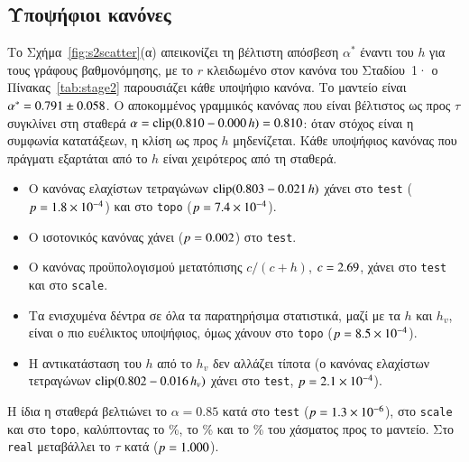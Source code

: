 \documentclass[11pt,a4paper]{article}
\theoremstyle{definition}
\theoremstyle{remark}
\newcommand{\clip}{\mathrm{clip}}
\begin{document}
\subsection{Υποψήφιοι κανόνες}
Το Σχήμα~\ref{fig:s2scatter}(α) απεικονίζει τη βέλτιστη απόσβεση $\alpha^*$ έναντι του $h$ για τους
γράφους βαθμονόμησης, με το $r$ κλειδωμένο στον κανόνα του Σταδίου~1· ο Πίνακας~\ref{tab:stage2}
παρουσιάζει κάθε υποψήφιο κανόνα. Το μαντείο είναι $\alpha^*=0.791\pm0.058$. Ο
αποκομμένος γραμμικός κανόνας που είναι βέλτιστος ως προς $\tau$ συγκλίνει στη σταθερά
$\alpha=\clip(0.810-0.000\,h)=\STwoConstAlpha$: όταν στόχος είναι η συμφωνία κατατάξεων, η κλίση ως προς
$h$ μηδενίζεται. Κάθε υποψήφιος κανόνας που πράγματι εξαρτάται από το $h$ είναι χειρότερος από τη
σταθερά.
\begin{itemize}[leftmargin=1.4em,itemsep=0pt]
\item Ο κανόνας ελαχίστων τετραγώνων $\clip(\STwoLSa\STwoLSb\,h)$ χάνει \STwoTestLSvsConst{} στο
\texttt{test} ($p=1.8\times10^{-4}$) και \STwoTopoLSvsConst{} στο \texttt{topo}
($p=7.4\times10^{-4}$).
\item Ο ισοτονικός κανόνας χάνει \STwoTestIsoVsConst{} ($p=0.002$) στο \texttt{test}.
\item Ο κανόνας προϋπολογισμού μετατόπισης $c/(c+h)$, $c=2.69$, χάνει \STwoTestBudVsConst{} στο
\texttt{test} και \STwoScaleBudVsConst{} στο \texttt{scale}.
\item Τα ενισχυμένα δέντρα σε όλα τα παρατηρήσιμα στατιστικά, μαζί με τα $h$ και $h_v$, είναι ο πιο
ευέλικτος υποψήφιος, όμως χάνουν \STwoTopoGbmVsConst{} στο \texttt{topo} ($p=8.5\times10^{-4}$).
\item Η αντικατάσταση του $h$ από το $h_v$ δεν αλλάζει τίποτα (ο κανόνας ελαχίστων τετραγώνων
$\clip(\STwoLSva\STwoLSvb\,h_v)$ χάνει \STwoTestLSvVsConst{} στο \texttt{test},
$p=2.1\times10^{-4}$).
\end{itemize}
Η ίδια η σταθερά βελτιώνει το $\alpha=0.85$ κατά \STwoTestConstVs{} στο \texttt{test}
($p=1.3\times10^{-6}$), \STwoScaleConstVs{} στο \texttt{scale} και \STwoTopoConstVs{} στο \texttt{topo},
καλύπτοντας το \STwoTestConstGap\%, το \STwoScaleConstGap\% και το \STwoTopoConstGap\% του χάσματος προς
το μαντείο. Στο \texttt{real} μεταβάλλει το $\tau$ κατά \STwoRealConstVs{} ($p=1.000$).


\end{document}
